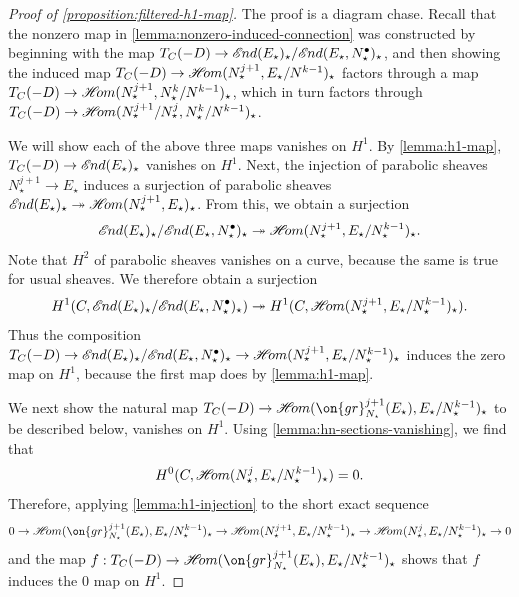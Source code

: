 \documentclass[12 pt]{amsart}
\theoremstyle{plain}
\theoremstyle{definition}
\theoremstyle{remark}
\numberwithin{equation}{section}
\newcommand*{\sheafhom}{\mathscr{H}\kern -2pt om}
\newcommand*{\sheafend}{\mathscr{E}\kern -1pt nd}
\begin{document}
\begin{proof}[Proof of \autoref{proposition:filtered-h1-map}]
	The proof is a diagram chase.
	Recall that the nonzero map in \autoref{lemma:nonzero-induced-connection} was
	constructed by beginning with the map $T_C(-D) \to
	\sheafend(E_\star)_\star/\sheafend(E_\star, N_\star^\bullet)_\star$, and then showing the induced map
	$T_C(-D) \to
	\sheafhom(N^{j+1}_\star, E_\star/N^{k-1})_\star$
	factors through a map
	$T_C(-D) \to
	\sheafhom(N^{j+1}_\star, N^k_\star/N^{k-1})_\star$,
	which in turn factors through
	$T_C(-D) \to
	\sheafhom(N^{j+1}_\star/N^j_\star, N^k_\star/N^{k-1})_\star$.

	We will show each of the above three maps vanishes on $H^1$.
	By \autoref{lemma:h1-map}, 
	$T_C(-D) \to
	\sheafend(E_\star)_\star$
	vanishes on $H^1$.
	Next, the injection of parabolic sheaves $N^{j+1}_\star \to E_\star$ induces a
surjection of parabolic sheaves $\sheafend(E_\star)_\star\twoheadrightarrow
\sheafhom(N_\star^{j+1}, E_\star)_\star$. 
From this, we obtain
a surjection
$$\sheafend(E_\star)_\star /\sheafend(E_\star,N^\bullet_\star)_\star \twoheadrightarrow \sheafhom(N_\star^{j+1},
E_\star/N_\star^{k-1})_\star.$$ 
Note that $H^2$ of parabolic sheaves vanishes on a curve, because the same is true
for usual sheaves. We therefore obtain a surjection
$$H^1(C,\sheafend(E_\star)_\star/\sheafend(E_\star,N^\bullet_\star)_\star)\twoheadrightarrow H^1(C,\sheafhom(N_\star^{j+1},
E_\star/N_\star^{k-1})_\star).$$ Thus the composition $T_C(-D)\to
\sheafend(E_\star)_\star/\sheafend(E_\star,N^\bullet_\star)_\star\to
\sheafhom(N_\star^{j+1}, E_\star/N_\star^{k-1})_\star$ induces
the zero map on $H^1$, because the first map does by \autoref{lemma:h1-map}. 

We next show the natural map $T_C(-D)\to \sheafhom(\on{gr}_{N_\star}^{j+1}(E_\star),
E_\star/N_\star^{k-1})_\star$ to be described below, vanishes on $H^1$.
Using \autoref{lemma:hn-sections-vanishing}, we find that
$$H^0(C, \sheafhom(N_\star^{j}, E_\star/N_\star^{k-1})_\star)=0.$$
Therefore, applying \autoref{lemma:h1-injection} to the short exact sequence $$0\to \sheafhom(\on{gr}_{N_\star}^{j+1}(E_\star),
E_\star/N_\star^{k-1})_\star \to \sheafhom(N_\star^{j+1},
E_\star/N_\star^{k-1})_\star \to
\sheafhom(N_\star^{j}, E_\star/N_\star^{k-1})_\star \to 0$$ 
and the map $f: T_C(-D) \to \sheafhom(\on{gr}_{N_\star}^{j+1}(E_\star),
E_\star/N_\star^{k-1})_\star$
shows that $f$ induces the $0$ map on $H^1$.


\end{proof}
\end{document}
